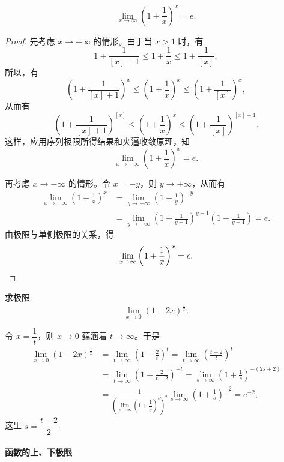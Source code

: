 \begin{theorem}[{第二个重要极限}]\label{theorem:ma-3-source-54}
\[
  \lim_{x\to\infty}\left(1+\frac1x\right)^x=e.
\]
\end{theorem}


\begin{proof}
先考虑 $x\to+\infty$ 的情形。由于当 $x>1$ 时，有
\[
  1+\frac1{[x]+1}\leqslant 1+\frac1x\leqslant 1+\frac1{[x]},
\]
所以，有
\[
  \left(1+\frac1{[x]+1}\right)^x
  \leqslant \left(1+\frac1x\right)^x
  \leqslant \left(1+\frac1{[x]}\right)^x,
\]
从而有
\[
  \left(1+\frac1{[x]+1}\right)^{[x]}
  \leqslant \left(1+\frac1x\right)^x
  \leqslant \left(1+\frac1{[x]}\right)^{[x]+1}.
\]
这样，应用序列极限所得结果和夹逼收敛原理，知
\[
  \lim_{x\to+\infty}\left(1+\frac1x\right)^x=e.
\]

再考虑 $x\to-\infty$ 的情形。令 $x=-y$，则 $y\to+\infty$，从而有
\[
\begin{aligned}
  \lim_{x\to-\infty}\left(1+\frac1x\right)^x
  &=\lim_{y\to+\infty}\left(1-\frac1y\right)^{-y}\\
  &=\lim_{y\to+\infty}\left(1+\frac1{y-1}\right)^{y-1}\left(1+\frac1{y-1}\right)=e.
\end{aligned}
\]
由极限与单侧极限的关系，得
\[
  \lim_{x\to\infty}\left(1+\frac1x\right)^x=e.
\qedhere
\]
\end{proof}


\begin{example}\label{example:ma-3-1-15}
求极限
\[
  \lim_{x\to0}(1-2x)^{\frac1x}.
\]
\end{example}


\begin{solve}
令 $x=\dfrac1t$，则 $x\to0$ 蕴涵着 $t\to\infty$。于是
\[
\begin{aligned}
  \lim_{x\to0}(1-2x)^{\frac1x}
  &=\lim_{t\to\infty}\left(1-\frac2t\right)^t
  =\lim_{t\to\infty}\left(\frac{t-2}{t}\right)^t\\
  &=\lim_{t\to\infty}\left(1+\frac2{t-2}\right)^{-t}
  =\lim_{s\to\infty}\left(1+\frac1s\right)^{-(2s+2)}\\
  &=\frac1{\left(\lim\limits_{s\to\infty}\left(1+\dfrac1s\right)^s\right)^2}
  \lim_{s\to\infty}\left(1+\frac1s\right)^{-2}=e^{-2},
\end{aligned}
\]
这里 $s=\dfrac{t-2}{2}$.
\end{solve}


\paragraph*{函数的上、下极限}


